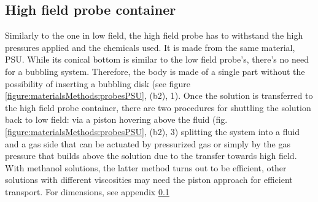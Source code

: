         \subsection{High field probe container}
        Similarly to the one in low field, the high field probe has to withstand the high pressures applied and the chemicals used. It is made from the same material, PSU.  While its conical bottom is similar to the low field probe's, there's no need for a bubbling system.  Therefore, the body is made of a single part without the possibility of inserting a bubbling disk (see figure \ref{figure:materialsMethods:probesPSU}, (b2), 1).  Once the solution is transferred to the high field probe container, there are two procedures for shuttling the solution back to low field: via a piston hovering above the fluid (fig. \ref{figure:materialsMethods:probesPSU}, (b2), 3) splitting the system into a fluid and a gas side that can be actuated by pressurized gas or simply by the gas pressure that builds above the solution due to the transfer towards high field.  With methanol solutions, the latter method turns out to be efficient, other solutions with different viscosities may need the piston approach for efficient transport.
        For dimensions, see appendix \ref{}

